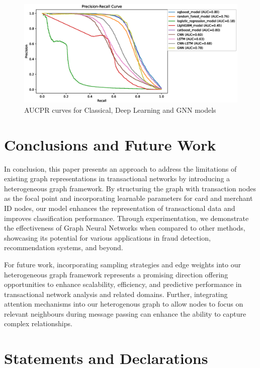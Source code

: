 \documentclass[pdflatex,sn-mathphys-num]{sn-jnl}%
\begin{document}
\clearpage


\begin{figure}
    \centering
    \includegraphics[width=1.0\textwidth]{AUCPR_Curve.eps}
    \caption{AUCPR curves for Classical, Deep Learning and GNN models}
\end{figure}


\section{Conclusions and Future Work}\label{sec5}

In conclusion, this paper presents an approach to address the limitations of existing graph representations in transactional networks by introducing a heterogeneous graph framework. By structuring the graph with transaction nodes as the focal point and incorporating learnable parameters for card and merchant ID nodes, our model enhances the representation of transactional data and improves classification performance. Through experimentation, we demonstrate the effectiveness of Graph Neural Networks when compared to other methods, showcasing its potential for various applications in fraud detection, recommendation systems, and beyond.

For future work, incorporating sampling strategies and edge weights into our heterogeneous graph framework represents a promising direction offering opportunities to enhance scalability, efficiency, and predictive performance in transactional network analysis and related domains. Further, integrating attention mechanisms into our heterogenous graph to allow nodes to focus on relevant neighbours during message passing can enhance the ability to capture complex relationships.

\section{Statements and Declarations}\label{sec6}
\end{document}
